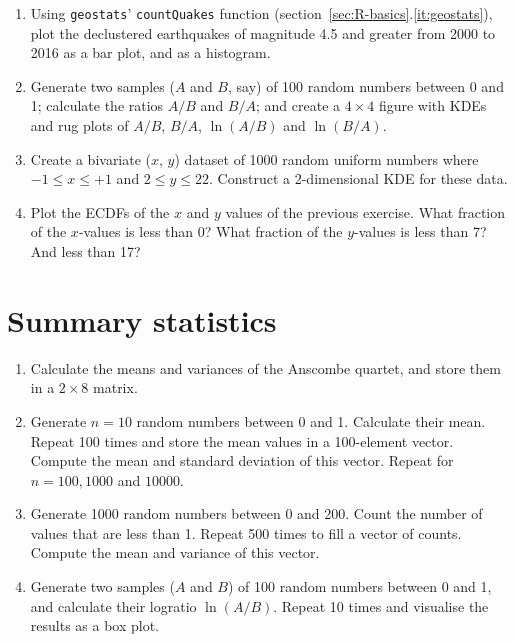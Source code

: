 \begin{enumerate}
  
\item Using \texttt{geostats}' \texttt{countQuakes} function
  (section~\ref{sec:R-basics}.\ref{it:geostats}), plot the declustered
  earthquakes of magnitude 4.5 and greater from 2000 to 2016 as a bar
  plot, and as a histogram.

\item\label{it:AB} Generate two samples ($A$ and $B$, say) of 100
  random numbers between 0 and 1; calculate the ratios $A/B$ and
  $B/A$; and create a ${4}\times{4}$ figure with KDEs and rug plots of
  $A/B$, $B/A$, $\ln(A/B)$ and $\ln(B/A)$.
  
\item\label{it:randxy} Create a bivariate ($x$, $y$) dataset of 1000
  random uniform numbers where $-1\leq{x}\leq{+1}$ and
  $2\leq{y}\leq{22}$. Construct a 2-dimensional KDE for these data.
  
\item Plot the ECDFs of the $x$ and $y$ values of the previous
  exercise. What fraction of the $x$-values is less than 0?  What
  fraction of the $y$-values is less than 7? And less than 17?

\end{enumerate}

\section{Summary statistics}
\label{sec:ex-summary-statistics}

\begin{enumerate}
  
\item Calculate the means and variances of the Anscombe quartet, and
  store them in a ${2}\times{8}$ matrix.

\item Generate $n=10$ random numbers between 0 and 1. Calculate their
  mean. Repeat 100 times and store the mean values in a 100-element
  vector. Compute the mean and standard deviation of this vector.
  Repeat for $n=100, 1000$ and $10000$.

\item Generate 1000 random numbers between 0 and 200. Count the number
  of values that are less than 1. Repeat 500 times to fill a vector of
  counts. Compute the mean and variance of this vector.
  
\item Generate two samples ($A$ and $B$) of 100 random numbers between
  0 and 1, and calculate their logratio $\ln(A/B)$. Repeat 10 times
  and visualise the results as a box plot.

\end{enumerate}

